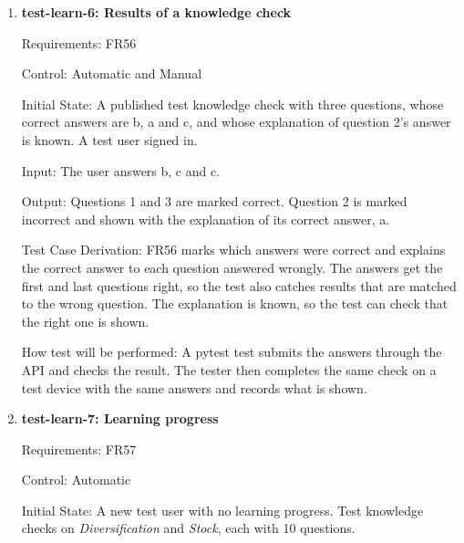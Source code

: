 \documentclass[12pt, titlepage]{article}
\begin{document}
\begin{enumerate}
Test Case Derivation: \texttt{CONCENTRATION\_LIMIT} is 50\%, and FR54 explains
diversification only when one holding is more than it. Before the purchase,
each holding is exactly $500 / 1000 = 50\%$, so no explanation is shown.
After it, B is $600 / 1100 \approx 54.5\%$, which is above the limit. The fit
criterion also requires that the explanation names no asset to buy or sell
(Hazard Analysis, SAF-9), and checking the text against the whole asset list
covers every asset it could name.

How test will be performed: A pytest test sets up the portfolio, reads the
portfolio view before and after the purchase, and searches the explanation's
text for each symbol and name on the asset list.

\item{\textbf{test-learn-6: Results of a knowledge check}\\}

Requirements: FR56

Control: Automatic and Manual

Initial State: A published test knowledge check with three questions, whose
correct answers are b, a and c, and whose explanation of question 2's answer
is known. A test user signed in.

Input: The user answers b, c and c.

Output: Questions 1 and 3 are marked correct. Question 2 is marked incorrect
and shown with the explanation of its correct answer, a.

Test Case Derivation: FR56 marks which answers were correct and explains the
correct answer to each question answered wrongly. The answers get the first
and last questions right, so the test also catches results that are matched
to the wrong question. The explanation is known, so the test can check that
the right one is shown.

How test will be performed: A pytest test submits the answers through the API
and checks the result. The tester then completes the same check on a test
device with the same answers and records what is shown.

\item{\textbf{test-learn-7: Learning progress}\\}

Requirements: FR57

Control: Automatic

Initial State: A new test user with no learning progress. Test knowledge checks
on \textit{Diversification} and \textit{Stock}, each with 10 questions.


\end{enumerate}
\end{document}
